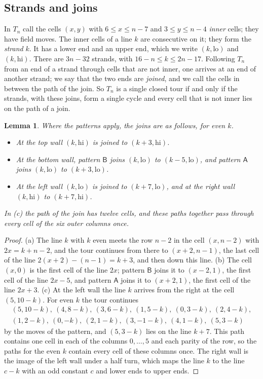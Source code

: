 \documentclass[11pt]{amsart}
\newtheorem{lemma}[theorem]{Lemma}
\theoremstyle{remark}
\newcommand{\lo}{\mathrm{lo}}
\newcommand{\hi}{\mathrm{hi}}
\begin{document}
\subsection*{Strands and joins}
In $T_n$ call the cells $(x,y)$ with $6\le x\le n-7$ and $3\le y\le n-4$ \emph{inner} cells; they have field
moves. The inner cells of a line $k$ are consecutive on it; they form the \emph{strand} $k$. It has a lower end
and an upper end, which we write $(k,\lo)$ and $(k,\hi)$. There are $3n-32$ strands, with $16-n\le k\le 2n-17$.
Following $T_n$ from an end of a strand through cells that are not inner, one arrives at an end of another strand;
we say that the two ends are \emph{joined}, and we call the cells in between the path of the join. So $T_n$ is a
single closed tour if and only if the strands, with these joins, form a single cycle and every cell that is not
inner lies on the path of a join.

\begin{lemma}\label{lem:joins}
Where the patterns apply, the joins are as follows, for even $k$.
\begin{itemize}
\item[(a)] At the top wall $(k,\hi)$ is joined to $(k+3,\hi)$.
\item[(b)] At the bottom wall, pattern $\mathsf B$ joins $(k,\lo)$ to $(k-5,\lo)$, and pattern $\mathsf A$ joins
$(k,\lo)$ to $(k+3,\lo)$.
\item[(c)] At the left wall $(k,\lo)$ is joined to $(k+7,\lo)$, and at the right wall $(k,\hi)$ to $(k+7,\hi)$.
\end{itemize}
In (c) the path of the join has twelve cells, and these paths together pass through every cell of the six outer
columns once.
\end{lemma}
\begin{proof}
(a) The line $k$ with $k$ even meets the row $n-2$ in the cell $(x,n-2)$ with $2x=k+n-2$, and the tour continues
from there to $(x+2,n-1)$, the last cell of the line $2(x+2)-(n-1)=k+3$, and then down this line.
(b) The cell $(x,0)$ is the first cell of the line $2x$; pattern $\mathsf B$ joins it to $(x-2,1)$, the first cell
of the line $2x-5$, and pattern $\mathsf A$ joins it to $(x+2,1)$, the first cell of the line $2x+3$.
(c) At the left wall the line $k$ arrives from the right at the cell $(5,10-k)$. For even $k$ the tour continues
\begin{multline*}
(5,10-k),\ (4,8-k),\ (3,6-k),\ (1,5-k),\ (0,3-k),\ (2,4-k),\\ (1,2-k),\ (0,-k),\ (2,1-k),\ (3,-1-k),\ (4,1-k),\ (5,3-k)
\end{multline*}
by the moves of the pattern, and $(5,3-k)$ lies on the line $k+7$. This path contains one cell in each of the
columns $0,\dots,5$ and each parity of the row, so the paths for the even $k$ contain every cell of these columns
once. The right wall is the image of the left wall under a half turn, which maps the line $k$ to the line $c-k$
with an odd constant $c$ and lower ends to upper ends.
\end{proof}
\end{document}
